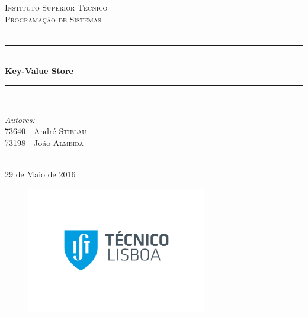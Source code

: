 \documentclass[12pt]{article} %
\begin{document}

\begin{titlepage}

\newcommand{\HRule}{\rule{\linewidth}{0.5mm}} %

\center %

\textsc{\LARGE Instituto Superior Tecnico}\\[1cm] %
\textsc{\Large Programação de Sistemas}\\[0.5cm] %
\textsc{\large}\\[0.5cm] %
\HRule \\[0.4cm]
{ \LARGE \bfseries Key-Value Store}\\[0.4cm]
\HRule \\[1cm]

\begin{minipage}{0.6\textwidth}
\begin{flushleft} \large
\emph{Autores:}\\
73640 - André \textsc{Stielau}\\
73198 - João \textsc{Almeida}\\

\end{flushleft}
\end{minipage}
~
\\[1cm]
{\large 29 de Maio de 2016}\\[1cm] %

\begin{figure}[H]
\centering
\includegraphics[width=0.7\textwidth]{./Pictures/tecnico.png}
\end{figure}

\vfill %

\end{titlepage}
\end{document}
